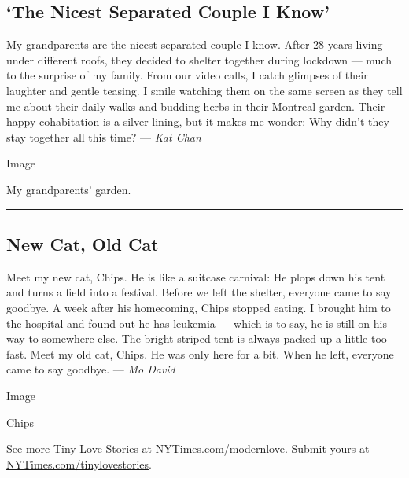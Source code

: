 \hypertarget{the-nicest-separated-couple-i-know}{%
\subsection{`The Nicest Separated Couple I
Know'}\label{the-nicest-separated-couple-i-know}}

My grandparents are the nicest separated couple I know. After 28 years
living under different roofs, they decided to shelter together during
lockdown --- much to the surprise of my family. From our video calls, I
catch glimpses of their laughter and gentle teasing. I smile watching
them on the same screen as they tell me about their daily walks and
budding herbs in their Montreal garden. Their happy cohabitation is a
silver lining, but it makes me wonder: Why didn't they stay together all
this time? --- \emph{Kat Chan}

Image

My grandparents' garden.

\begin{center}\rule{0.5\linewidth}{\linethickness}\end{center}

\hypertarget{new-cat-old-cat}{%
\subsection{New Cat, Old Cat}\label{new-cat-old-cat}}

Meet my new cat, Chips. He is like a suitcase carnival: He plops down
his tent and turns a field into a festival. Before we left the shelter,
everyone came to say goodbye. A week after his homecoming, Chips stopped
eating. I brought him to the hospital and found out he has leukemia ---
which is to say, he is still on his way to somewhere else. The bright
striped tent is always packed up a little too fast. Meet my old cat,
Chips. He was only here for a bit. When he left, everyone came to say
goodbye. --- \emph{Mo David}

Image

Chips

See more Tiny Love Stories at
\href{https://www.nytimes3xbfgragh.onion/column/modern-love}{NYTimes.com/modernlove}.
Submit yours at
\href{http://nytimes3xbfgragh.onion/tinylovestories}{NYTimes.com/tinylovestories}.

